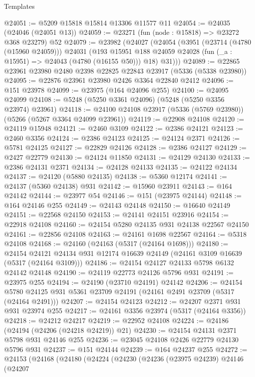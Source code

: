 \begin{lexlean}{Templates}
\begin{coremodule}
@24051 := @5209 @15818 @15814 @13306 @11577 @11
@24054 := @24035 (@24046 (@24051 @13))
@24059 := @23271 (fun (node : @15818) => @23272 @368 @23279) @52
@24079 := @23982
    (@24027
      (@24054
        (@3951
          (@23714 (@4780 (@15960 @24059)))
          @24031
          (@193 @15951 @188 @24059 @24028 (fun (_a : @15951) => @24043 (@4780 (@16155 @50))) @18)
          @31)))
@24089 := @22865 @23961 @23980 @2480 @2398 @22825 @22843 @23917 (@5336 (@5338 @23980))
@24095 := @22876 @23961 @23980 @2426 @3364 @22840 @2412
@24096 := @151 @23978
@24099 := @23975 (@164 @24096 @255)
@24100 := @24095 @24099
@24108 := @5248 (@5250 @3361 @24096) (@5248 (@5250 @3356 @23974) @23961)
@24118 := @24100 @24108 @23917 (@5336 (@5769 @23980)) (@5266 (@5267 @3364 @24099 @23961))
@24119 := @22908 @24108
@24120 := @24119 @15948
@24121 := @2460 @3109
@24122 := @2386 @24121
@24123 := @2460 @3356
@24124 := @2386 @24123
@24125 := @24124 @2371
@24126 := @5781 @24125
@24127 := @22829 @24126
@24128 := @2386 @24127
@24129 := @2427 @22779
@24130 := @24124 @11850
@24131 := @24129 @24130
@24133 := @2386 @24131 @2371
@24134 := @24128 @24133
@24135 := @24122 @24134
@24137 := @24120 (@5880 @24135)
@24138 := @5360 @12174
@24141 := @24137 (@5360 @24138) @931
@24142 := @15960 @23911
@24143 := @164 @24142
@24144 := @23977 @54
@24146 := @151 (@23975 @24144)
@24148 := @164 @24146 @255
@24149 := @24143 @24148
@24150 := @16640 @24149
@24151 := @22568 @24150
@24153 := @24141 @24151 @23916
@24154 := @22918 @24108
@24160 := @24154 @5280 @24135 @931 @24138 @22567 @24150
@24161 := @22856 @24108
@24163 := @24161 @1698 @22567
@24164 := @5318 @24108
@24168 := @24160 (@24163 (@5317 (@24164 @1698)))
@24180 := @24154
    @24121
    @24134
    @931
    @12174
    @16639
    @24149
    (@24161 @3109 @16639 (@5317 (@24164 @3109)))
@24186 := @24154 @24127 @24133 @5798 @6132 @24142 @24148
@24190 := @24119 @22773 @24126 @5796 @931
@24191 := @23975 @255
@24194 := @24190 (@23710 @24191) @24142
@24206 := @24154 @5780 @24125 @931 @5361 @23709 @24191 (@24161 @2491 @23709 (@5317 (@24164 @2491)))
@24207 := @24154 @24123
@24212 := @24207 @2371 @931 @931 @23974 @255
@24217 := @24161 @3356 @23974 (@5317 (@24164 @3356))
@24218 := @24212 @24217
@24219 := @22952 @24108
@24224 := @24186 (@24194 (@24206 (@24218 @24219)) @21)
@24230 := @24154 @24131 @2371 @5798 @931 @24146 @255
@24236 := @23045 @24108 @2426 @22779 @24130 @5796 @931
@24237 := @151 @24144
@24239 := @164 @24237 @255
@24272 := @24153
    (@24168
      (@24180
        (@24224
          (@24230
            (@24236
              (@23975 @24239)
              @24146
              (@24207

\end{coremodule}
\end{lexlean}
